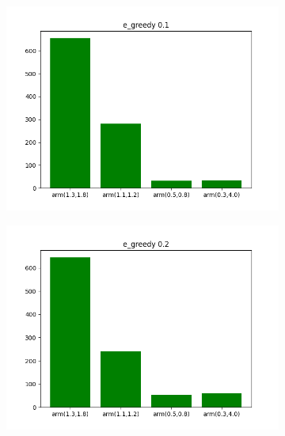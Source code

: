 \documentclass[letterpaper]{article}
\begin{document}
\begin{figure}[H]
\begin{subfigure}{.5\textwidth}
    \includegraphics[width=1\linewidth]{images/assign3/ex2/arms_e_greedy01}
    \caption{}
    \label{fig:arms_e_greedy01_ex2}
  \end{subfigure}
  \begin{subfigure}{.5\textwidth}
    \centering
    \includegraphics[width=1\linewidth]{images/assign3/ex2/arms_e_greedy02}
    \caption{}
    \label{fig:arms_e_greedy02_ex2}
  \end{subfigure}
  \begin{subfigure}{.5\textwidth}
    \centering

\end{subfigure}
\end{figure}
\end{document}
